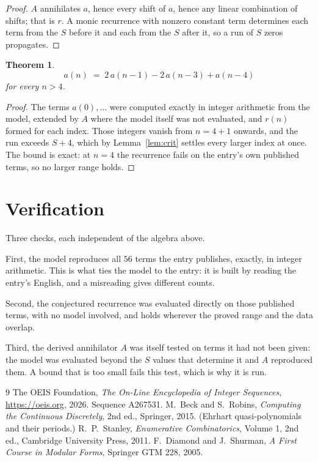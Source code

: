 \documentclass[11pt,a4paper]{article}
\theoremstyle{plain}
\newtheorem{theorem}{Theorem}
\theoremstyle{definition}
\begin{document}
\begin{proof}
$A$ annihilates $a$, hence every shift of $a$, hence any linear combination of shifts; that is
$r$. A monic recurrence with nonzero constant term determines each term from the $S$ before it
and each from the $S$ after it, so a run of $S$ zeros propagates.
\end{proof}

\begin{theorem}
\[
a(n)\;=\;2\,a(n-1) - 2\,a(n-3) + a(n-4)
\]
for every $n>4$.
\end{theorem}

\begin{proof}
The terms $a(0),\dots$ were computed exactly in integer arithmetic from the model, extended by
$A$ where the model itself was not evaluated, and $r(n)$ formed for each index. Those integers
vanish from $n=4+1$ onwards, and the run exceeds $S+4$, which by
Lemma~\ref{lem:crit} settles every larger index at once. The bound is exact: at $n=4$ the recurrence fails on the entry's own published terms, so no larger range holds.
\end{proof}

\section{Verification}

Three checks, each independent of the algebra above.

First, the model reproduces all $56$ terms the entry publishes, exactly, in integer
arithmetic. This is what ties the model to the entry: it is built by reading the entry's
English, and a misreading gives different counts.

Second, the conjectured recurrence was evaluated directly on those published terms, with no
model involved, and holds wherever the proved range and the data overlap.

Third, the derived annihilator $A$ was itself tested on terms it had not been given: the model
was evaluated beyond the $S$ values that determine it and $A$ reproduced them. A bound that is
too small fails this test, which is why it is run.

\begin{thebibliography}{9}
 The OEIS Foundation, \emph{The On-Line Encyclopedia of Integer
Sequences}, \url{https://oeis.org}, 2026. Sequence A267531.
 M.~Beck and S.~Robins, \emph{Computing the Continuous Discretely},
2nd ed., Springer, 2015. (Ehrhart quasi-polynomials and their periods.)
 R.~P.~Stanley, \emph{Enumerative Combinatorics}, Volume 1, 2nd ed.,
Cambridge University Press, 2011.
 F.~Diamond and J.~Shurman, \emph{A First Course in Modular Forms},
Springer GTM 228, 2005.
\end{thebibliography}
\end{document}
